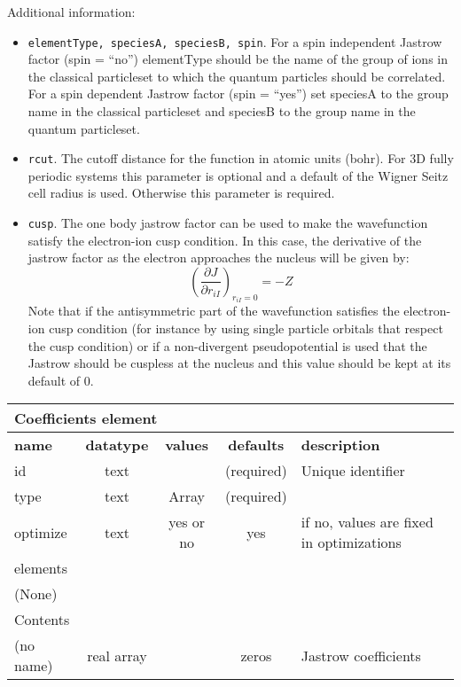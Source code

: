 Additional information:

 \begin{itemize}
 \item \texttt{elementType, speciesA, speciesB, spin}.  For a spin independent Jastrow factor (spin = ``no'')
elementType should be the name of the group of ions in the classical particleset to which the quantum
particles should be correlated.  For a spin dependent Jastrow factor (spin = ``yes'') set speciesA to the
group name in the classical particleset and speciesB to the group name in the quantum particleset.
 \item \texttt{rcut}. The cutoff distance for the function in atomic units (bohr). 
For 3D fully periodic systems this parameter is optional and a default of the Wigner 
Seitz cell radius is used. Otherwise this parameter is required.
 \item \texttt{cusp}. The one body jastrow factor can be used to make the wavefunction
satisfy the electron-ion cusp condition\cite{kato}.  In this case, the derivative of the jastrow
factor as the electron approaches the nucleus will be given by:
\begin{equation}
\left(\frac{\partial J}{\partial r_{iI}}\right)_{r_{iI} = 0} = -Z
\end{equation}
Note that if the antisymmetric part of the wavefunction satisfies the electron-ion cusp
condition (for instance by using single particle orbitals that respect the cusp condition)
or if a non-divergent pseudopotential is used that the Jastrow should be cuspless at the 
nucleus and this value should be kept at its default of 0.
 \end{itemize}


\begin{table}[h]
\begin{center}
\begin{tabular}{l c c c l }
\hline
\multicolumn{5}{l}{Coefficients element} \\
\hline
\bfseries name & \bfseries datatype & \bfseries values & \bfseries defaults & \bfseries description \\
\hline
id & text & & (required) & Unique identifier \\
type & text & Array & (required) & \\
optimize & text & yes or no & yes & if no, values are fixed in optimizations \\
\hline
\multicolumn{5}{l}{elements}\\ \hline
(None) & & & \\ \hline
\multicolumn{5}{l}{Contents}\\ \hline
 (no name) & real array & & zeros & Jastrow coefficients \\ \hline
\end{tabular}
\end{center}
\end{table}


